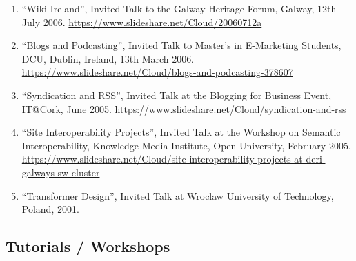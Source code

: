 \documentclass[10pt,a4paper]{res} %
\begin{document}
\begin{resume}
\begin{enumerate}
\item ``Wiki Ireland'', Invited Talk to the Galway Heritage Forum, Galway, 12th July 2006. \url{https://www.slideshare.net/Cloud/20060712a}
\item ``Blogs and Podcasting'', Invited Talk to Master's in E-Marketing Students, DCU, Dublin, Ireland, 13th March 2006. \url{https://www.slideshare.net/Cloud/blogs-and-podcasting-378607}
\item ``Syndication and RSS'', Invited Talk at the Blogging for Business Event, IT@Cork, June 2005. \url{https://www.slideshare.net/Cloud/syndication-and-rss}
\item ``Site Interoperability Projects'', Invited Talk at the Workshop on Semantic Interoperability, Knowledge Media Institute, Open University, February 2005. \url{https://www.slideshare.net/Cloud/site-interoperability-projects-at-deri-galways-sw-cluster}
\item ``Transformer Design'', Invited Talk at Wroclaw University of Technology, Poland, 2001. %
\end{enumerate}

\subsection*{Tutorials / Workshops}


\end{resume}
\end{document}
